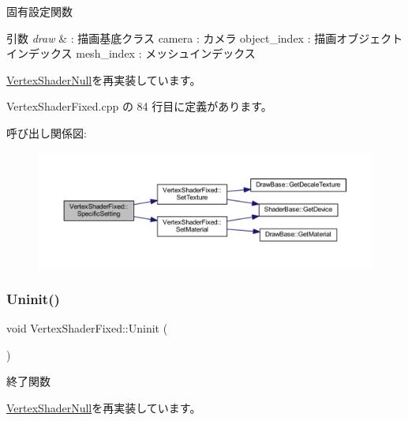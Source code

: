 固有設定関数 


\begin{DoxyParams}{引数}
{\em draw} & \+: 描画基底クラス camera \+: カメラ object\+\_\+index \+: 描画オブジェクトインデックス mesh\+\_\+index \+: メッシュインデックス \\
\hline
\end{DoxyParams}


\mbox{\hyperlink{class_vertex_shader_null_aa2234c6ea083e3c0233d59f222145992}{Vertex\+Shader\+Null}}を再実装しています。



 Vertex\+Shader\+Fixed.\+cpp の 84 行目に定義があります。

呼び出し関係図\+:\nopagebreak
\begin{figure}[H]
\begin{center}
\leavevmode
\includegraphics[width=350pt]{class_vertex_shader_fixed_a87523c320f6f6767d59d7b24265db7ec_cgraph}
\end{center}
\end{figure}
\mbox{\label{class_vertex_shader_fixed_a49f630aee4757c8fd8bae886f22dfeb0}} 
\subsubsection{\texorpdfstring{Uninit()}{Uninit()}}
{\footnotesize\ttfamily void Vertex\+Shader\+Fixed\+::\+Uninit (\begin{DoxyParamCaption}{ }\end{DoxyParamCaption})\hspace{0.3cm}{\ttfamily [virtual]}}



終了関数 



\mbox{\hyperlink{class_vertex_shader_null_a16334df4ac02db3dd63f042622032301}{Vertex\+Shader\+Null}}を再実装しています。



